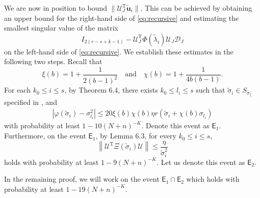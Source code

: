 \documentclass[reqno]{amsart}
\newcommand{\T}{\mathrm{T}}
\theoremstyle{plain}
\theoremstyle{definition}
\begin{document}
We are now in position to bound $\| \mathcal U_{J}^\T \widetilde{\mathbf u}_i \|$. This can be achieved by obtaining an upper bound for the right-hand side of \eqref{eq:recursive} and estimating the smallest singular value of the matrix 
\begin{equation}\label{eq:bigmatrix}
 I_{2(r-s+k-1)} - \mathcal U_J^\T \Phi(\widetilde \lambda_i) {\mathcal U}_J {\mathcal D}_J 
\end{equation}
on the left-hand side of \eqref{eq:recursive}. We establish these estimates in the following two steps. Recall that 
$$\xi(b)= 1+ \frac{1}{2(b-1)^2}\quad \text{and} \quad \chi(b)= 1+ \frac{1}{4b(b-1)}.$$
For each $k_0 \le i \le s$, by Theorem  6.4, there exists $k_0 \le l_i \le s$ such that $\widetilde \sigma_i \in S_{\sigma_{l_i}}$ specified in \cite[Eq. (35)]{Wang24}, and 
\begin{align}\label{eq:location01}
|\varphi(\widetilde{\sigma}_{i}) - \sigma_{l_i}^2| \leq 20\xi(b) \chi(b)\eta r \left(\widetilde{\sigma}_{i}+\chi(b)\sigma_{l_i} \right)
\end{align}
with probability at least $1-10(N+n)^{-K}$. Denote this event as $\mathsf E_1$. Furthermore, on the event $\mathsf E_1$, by Lemma 6.3, for every $k_0\le i \le s$,
$$\left\|  \mathcal U^\T \Xi(\widetilde \sigma_i) \mathcal U \right\| \leq \frac{\eta}{\widetilde \sigma_i^2}$$ holds with probability at least $1-9(N+n)^{-K}$. Let us denote this event as $\mathsf E_2$. 

In the remaining proof, we will work on the event $\mathsf E_1 \cap \mathsf E_2$ which holds with probability at least $1-19(N+n)^{-K}$.
\end{document}
